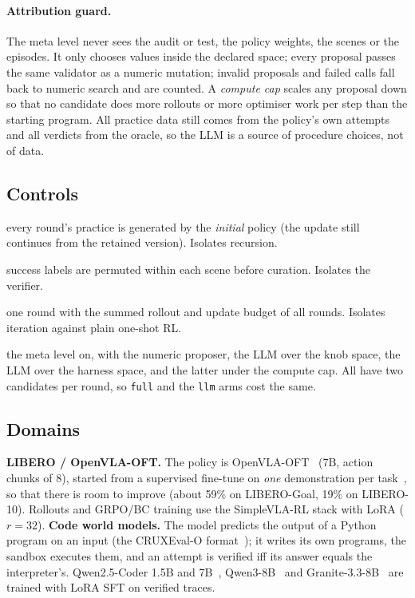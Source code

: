 \paragraph{Attribution guard.} The meta level never sees the audit or test, the policy weights, the scenes or the episodes. It only chooses values inside the declared space; every proposal passes the same validator as a numeric mutation; invalid proposals and failed calls fall back to numeric search and are counted. A \emph{compute cap} scales any proposal down so that no candidate does more rollouts or more optimiser work per step than the starting program. All practice data still comes from the policy's own attempts and all verdicts from the oracle, so the LLM is a source of procedure choices, not of data.

\subsection{Controls}
\label{sec:controls}
\begin{description}[nosep]
  \item[\texttt{nonrec}] every round's practice is generated by the \emph{initial} policy (the update still continues from the retained version). Isolates recursion.
  \item[\texttt{shuffled}] success labels are permuted within each scene before curation. Isolates the verifier.
  \item[\texttt{onebig}] one round with the summed rollout and update budget of all rounds. Isolates iteration against plain one-shot RL.
  \item[\texttt{full}, \texttt{llm}, \texttt{llm\_harness}, \texttt{llm\_harness\_cap}] the meta level on, with the numeric proposer, the LLM over the knob space, the LLM over the harness space, and the latter under the compute cap. All have two candidates per round, so \texttt{full} and the \texttt{llm} arms cost the same.
\end{description}

\subsection{Domains}
\textbf{LIBERO / OpenVLA-OFT.} The policy is OpenVLA-OFT~\cite{kim2025oft} (7B, action chunks of 8), started from a supervised fine-tune on \emph{one} demonstration per task~\cite{li2025simplevlarl}, so that there is room to improve (about 59\% on LIBERO-Goal, 19\% on LIBERO-10). Rollouts and GRPO/BC training use the SimpleVLA-RL stack with LoRA ($r{=}32$). \textbf{Code world models.} The model predicts the output of a Python program on an input (the CRUXEval-O format~\cite{gu2024cruxeval}); it writes its own programs, the sandbox executes them, and an attempt is verified iff its answer equals the interpreter's. Qwen2.5-Coder 1.5B and 7B~\cite{hui2024qwen25coder}, Qwen3-8B~\cite{yang2025qwen3} and Granite-3.3-8B~\cite{granite2024} are trained with LoRA SFT on verified traces.

